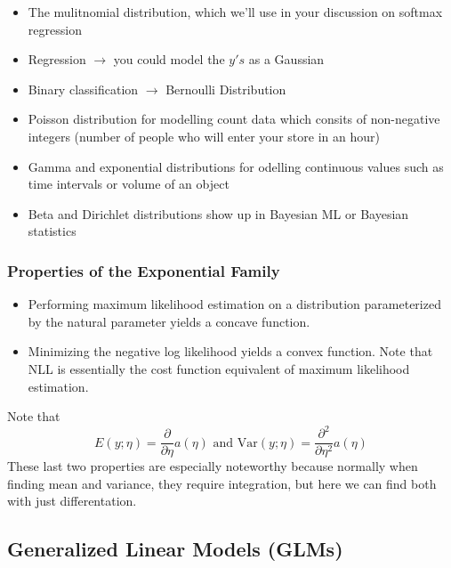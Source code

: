 \documentclass[12pt]{scrartcl}
\begin{document}
\begin{itemize}
    \item The mulitnomial distribution, which we'll use in your discussion on softmax regression
    \item Regression $\to$ you could model the $y's$ as a Gaussian
    \item Binary classification $\to$ Bernoulli Distribution
    \item Poisson distribution for modelling count data which consits of non-negative integers (number of people who will enter your store in an hour)
    \item Gamma and exponential distributions for odelling continuous values such as time intervals or volume of an object
    \item Beta and Dirichlet distributions show up in Bayesian ML or Bayesian statistics
\end{itemize}

\subsubsection{Properties of the Exponential Family}
\begin{itemize}
    \item Performing maximum likelihood estimation on a distribution parameterized by the natural parameter yields a concave function.
    \item Minimizing the negative log likelihood yields a convex function. Note that NLL is essentially the cost function equivalent of maximum likelihood estimation.
\end{itemize}
\begin{note}
    Note that 
    \[E(y; \eta) = \frac{\partial}{\partial \eta}a(\eta) \text{ and Var}(y; \eta) = \frac{\partial^2}{\partial\eta^2}a(\eta)\]
    These last two properties are especially noteworthy because normally when finding mean and variance, they require integration, but here we can find both with just differentation.
\end{note}

\subsection{Generalized Linear Models (GLMs)}
\end{document}
